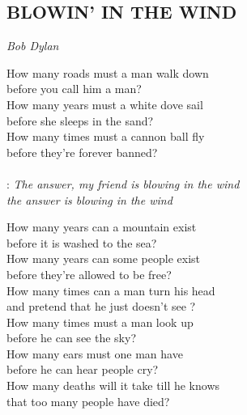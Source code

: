 \begin{flushleft}
	\section*{\Huge BLOWIN' IN THE WIND}
	\emph{Bob Dylan}
\end{flushleft}

How many roads must a man walk down\\
before you call him a man?\\
How many years must a white dove sail\\
before she sleeps in the sand?\\
How many times must a cannon ball fly\\
before they're forever banned?\\
\\
\textregistered:
\emph{
The answer, my friend is blowing in the wind\\
the answer is blowing in the wind\\
}

How many years can a mountain exist\\
before it is washed to the sea?\\
How many years can some people exist\\
before they're allowed to be free?\\
How many times can a man turn his head\\
and pretend that he just doesn't see ? \hspace{1cm} \textregistered\\

How many times must a man look up\\
before he can see the sky?\\
How many ears must one man have\\
before he can hear people cry?\\
How many deaths will it take till he knows\\
that too many people have died? \hspace{1cm} \textregistered
\newpage

